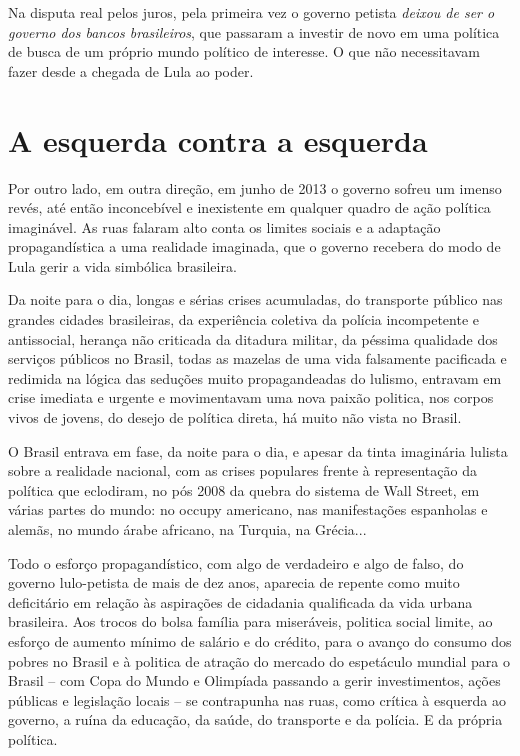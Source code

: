 Na disputa real pelos juros, pela primeira vez o governo petista
\emph{deixou de ser o governo dos bancos brasileiros}, que passaram a
investir de novo em uma política de busca de um próprio mundo político
de interesse. O que não necessitavam fazer desde a chegada de Lula ao
poder.

\chapter{A esquerda contra a
esquerda}\label{a-esquerda-contra-a-esquerda}

Por outro lado, em outra direção, em junho de 2013 o governo sofreu um
imenso revés, até então inconcebível e inexistente em qualquer quadro de
ação política imaginável. As ruas falaram alto conta os limites sociais
e a adaptação propagandística a uma realidade imaginada, que o governo
recebera do modo de Lula gerir a vida simbólica brasileira.

Da noite para o dia, longas e sérias crises acumuladas, do transporte
público nas grandes cidades brasileiras, da experiência coletiva da
polícia incompetente e antissocial, herança não criticada da ditadura
militar, da péssima qualidade dos serviços públicos no Brasil, todas as
mazelas de uma vida falsamente pacificada e redimida na lógica das
seduções muito propagandeadas do lulismo, entravam em crise imediata e
urgente e movimentavam uma nova paixão politica, nos corpos vivos de
jovens, do desejo de política direta, há muito não vista no Brasil.

O Brasil entrava em fase, da noite para o dia, e apesar da tinta
imaginária lulista sobre a realidade nacional, com as crises populares
frente à representação da política que eclodiram, no pós 2008 da quebra
do sistema de Wall Street, em várias partes do mundo: no occupy
americano, nas manifestações espanholas e alemãs, no mundo árabe
africano, na Turquia, na Grécia...

Todo o esforço propagandístico, com algo de verdadeiro e algo de falso,
do governo lulo-petista de mais de dez anos, aparecia de repente como
muito deficitário em relação às aspirações de cidadania qualificada da
vida urbana brasileira. Aos trocos do bolsa família para miseráveis,
politica social limite, ao esforço de aumento mínimo de salário e do
crédito, para o avanço do consumo dos pobres no Brasil e à politica de
atração do mercado do espetáculo mundial para o Brasil -- com Copa do
Mundo e Olimpíada passando a gerir investimentos, ações públicas e
legislação locais -- se contrapunha nas ruas, como crítica à esquerda ao
governo, a ruína da educação, da saúde, do transporte e da polícia. E da
própria política.

